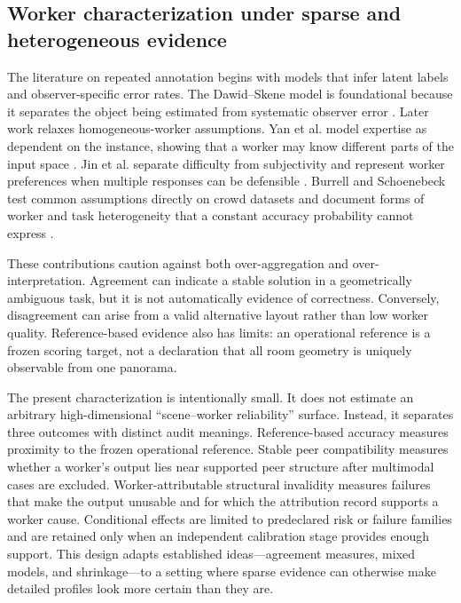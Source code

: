\subsection{Worker characterization under sparse and heterogeneous evidence}

The literature on repeated annotation begins with models that infer latent labels and observer-specific error rates. The Dawid--Skene model is foundational because it separates the object being estimated from systematic observer error \cite{dawid1979observer}. Later work relaxes homogeneous-worker assumptions. Yan et al. model expertise as dependent on the instance, showing that a worker may know different parts of the input space \cite{yan2010expertise}. Jin et al. separate difficulty from subjectivity and represent worker preferences when multiple responses can be defensible \cite{jin2018subjectivity}. Burrell and Schoenebeck test common assumptions directly on crowd datasets and document forms of worker and task heterogeneity that a constant accuracy probability cannot express \cite{burrell2023conventional}.

These contributions caution against both over-aggregation and over-interpretation. Agreement can indicate a stable solution in a geometrically ambiguous task, but it is not automatically evidence of correctness. Conversely, disagreement can arise from a valid alternative layout rather than low worker quality. Reference-based evidence also has limits: an operational reference is a frozen scoring target, not a declaration that all room geometry is uniquely observable from one panorama.

The present characterization is intentionally small. It does not estimate an arbitrary high-dimensional ``scene--worker reliability'' surface. Instead, it separates three outcomes with distinct audit meanings. Reference-based accuracy measures proximity to the frozen operational reference. Stable peer compatibility measures whether a worker's output lies near supported peer structure after multimodal cases are excluded. Worker-attributable structural invalidity measures failures that make the output unusable and for which the attribution record supports a worker cause. Conditional effects are limited to predeclared risk or failure families and are retained only when an independent calibration stage provides enough support. This design adapts established ideas---agreement measures, mixed models, and shrinkage---to a setting where sparse evidence can otherwise make detailed profiles look more certain than they are.

